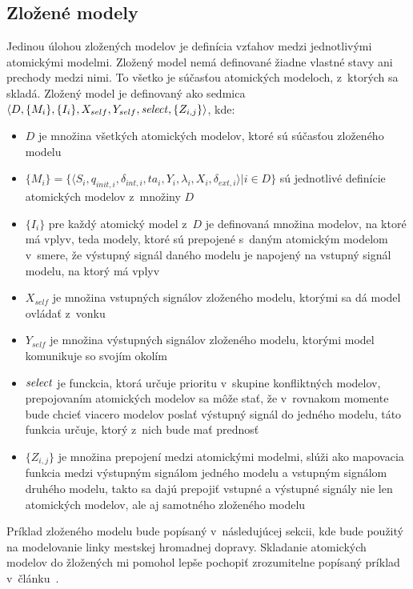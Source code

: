 \subsection*{Zložené modely}
Jedinou úlohou zložených modelov je definícia vzťahov medzi jednotlivými atomickými modelmi.
Zložený model nemá definované žiadne vlastné stavy ani prechody medzi nimi.
To všetko je súčasťou atomických modeloch, z~ktorých sa skladá.
Zložený model je definovaný ako sedmica $\langle D, \{M_i\}, \{I_i\}, X_{self}, Y_{self}, \text{\textit{select}}, \{Z_{i,j}\} \rangle$, kde:
\begin{itemize}
  \item $D$ je množina všetkých atomických modelov, ktoré sú súčasťou zloženého modelu
  \item $\{M_i\} = \{ \langle S_i, q_{init,i}, {\delta}_{int,i}, ta_i, Y_i, {\lambda}_i, X_i, {\delta}_{ext,i} \rangle | i \in D\}$ sú jednotlivé definície atomických modelov z~množiny $D$
  \item $\{I_i\}$ pre každý atomický model z~$D$ je definovaná množina modelov, na ktoré má vplyv, teda modely, ktoré sú prepojené s~daným atomickým modelom v~smere, že výstupný signál daného modelu je napojený na vstupný signál modelu, na ktorý má vplyv
  \item $X_{self}$ je množina vstupných signálov zloženého modelu, ktorými sa dá model ovládať z~vonku
  \item $Y_{self}$ je množina výstupných signálov zloženého modelu, ktorými model komunikuje so svojím okolím
  \item $\text{\textit{select}}$ je funckcia, ktorá určuje prioritu v~skupine konfliktných modelov, prepojovaním atomických modelov sa môže stať, že v~rovnakom momente bude chcieť viacero modelov poslať výstupný signál do jedného modelu, táto funkcia určuje, ktorý z~nich bude mať prednosť
  \item $\{Z_{i,j}\}$ je množina prepojení medzi atomickými modelmi, slúži ako mapovacia funkcia medzi výstupným signálom jedného modelu a vstupným signálom druhého modelu, takto sa dajú prepojiť vstupné a výstupné signály nie len atomických modelov, ale aj samotného zloženého modelu
\end{itemize}
Príklad zloženého modelu bude popísaný v~následujúcej sekcii, kde bude použitý na modelovanie linky mestskej hromadnej dopravy.
Skladanie atomických modelov do žložených mi pomohol lepše pochopiť zrozumitelne popísaný príklad v~článku~\cite{seo2014devs}.

